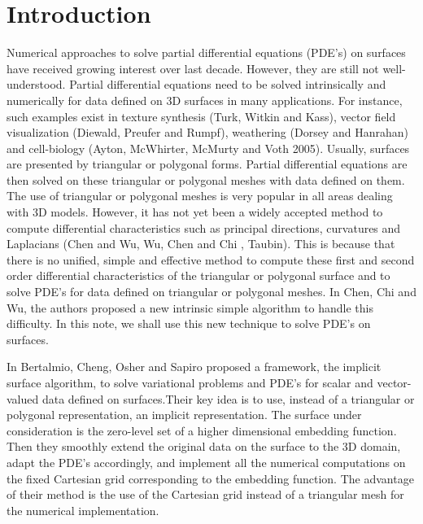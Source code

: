 \documentclass{elsart}
\begin{document}
\section{Introduction}
    Numerical approaches to solve partial differential equations (PDE's)
on surfaces have received growing interest over last decade.
However, they are still not well-understood. Partial differential
equations need to be solved intrinsically and numerically for data
defined on 3D surfaces in many applications. For instance, such
examples exist in texture synthesis (Turk\cite{Turk}, Witkin and
Kass\cite{Witkin}), vector field visualization (Diewald, Preufer and
Rumpf\cite{Clarenz}), weathering (Dorsey and Hanrahan\cite{Dorsey})
and cell-biology (Ayton, McWhirter, McMurty and Voth 2005). Usually,
surfaces are presented by triangular or polygonal forms. Partial
differential equations are then solved on these triangular or
polygonal meshes with data defined on them. The use of triangular or
polygonal meshes is very popular in all areas dealing with 3D
models. However, it has not yet been a widely accepted method to
compute differential characteristics such as principal directions,
curvatures and Laplacians (Chen and Wu\cite{Chen1}, Wu, Chen and Chi
\cite{Chen3,Chen4}, Taubin\cite{Taubin1,Taubin3}). This is because
that there is no unified, simple and effective method to compute
these first and second order differential characteristics of the
triangular or polygonal surface and to solve PDE's for data defined
on triangular or polygonal meshes. In Chen, Chi and Wu\cite{Chen5},
the authors proposed a new intrinsic simple algorithm to handle this
difficulty. In this note, we shall use this new technique to solve
PDE's on surfaces.


    In Bertalmio, Cheng, Osher and Sapiro\cite{Bertalmio} proposed a framework,
the implicit surface algorithm, to solve variational problems and
PDE's for scalar and vector-valued data defined on surfaces.Their
key idea is to use, instead of a triangular or polygonal
representation, an implicit representation. The surface under
consideration is the zero-level set of a higher dimensional
embedding function. Then they smoothly extend the original data on
the surface to the 3D domain, adapt the PDE's accordingly, and
implement all the numerical computations on the fixed Cartesian grid
corresponding to the embedding function. The advantage of their
method is the use of the Cartesian grid instead of a triangular mesh
for the numerical implementation.
\end{document}
